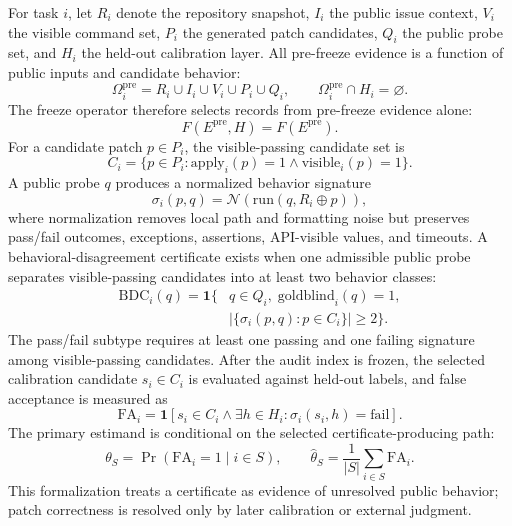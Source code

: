 \documentclass[conference]{IEEEtran}
\begin{document}
For task $i$, let $R_i$ denote the repository snapshot, $I_i$ the public issue context, $V_i$ the visible command set, $P_i$ the generated patch candidates, $Q_i$ the public probe set, and $H_i$ the held-out calibration layer.
All pre-freeze evidence is a function of public inputs and candidate behavior:
\begin{equation}
\Omega_i^{\mathrm{pre}} = R_i \cup I_i \cup V_i \cup P_i \cup Q_i,
\qquad
\Omega_i^{\mathrm{pre}} \cap H_i = \varnothing .
\end{equation}
The freeze operator therefore selects records from pre-freeze evidence alone:
\begin{equation}
F(E^{\mathrm{pre}}, H) = F(E^{\mathrm{pre}}).
\end{equation}
For a candidate patch $p \in P_i$, the visible-passing candidate set is
\begin{equation}
C_i = \{p \in P_i : \mathrm{apply}_i(p)=1 \land \mathrm{visible}_i(p)=1\}.
\end{equation}
A public probe $q$ produces a normalized behavior signature
\begin{equation}
\sigma_i(p,q)=\mathcal{N}(\mathrm{run}(q, R_i \oplus p)),
\end{equation}
where normalization removes local path and formatting noise but preserves pass/fail outcomes, exceptions, assertions, API-visible values, and timeouts.
A behavioral-disagreement certificate exists when one admissible public probe separates visible-passing candidates into at least two behavior classes:
\begin{equation}
\begin{aligned}
\mathrm{BDC}_i(q)=\mathbf{1}\{&
q \in Q_i,\; \mathrm{goldblind}_i(q)=1,\\
&\left|\{\sigma_i(p,q):p\in C_i\}\right|\ge 2\}.
\end{aligned}
\end{equation}
The pass/fail subtype requires at least one passing and one failing signature among visible-passing candidates.
After the audit index is frozen, the selected calibration candidate $s_i \in C_i$ is evaluated against held-out labels, and false acceptance is measured as
\begin{equation}
\mathrm{FA}_i=
\mathbf{1}\!\left[s_i\in C_i \land
\exists h\in H_i:\sigma_i(s_i,h)=\mathrm{fail}\right].
\end{equation}
The primary estimand is conditional on the selected certificate-producing path:
\begin{equation}
\theta_S=\Pr(\mathrm{FA}_i=1\mid i\in S),\qquad
\widehat{\theta}_S=\frac{1}{|S|}\sum_{i\in S}\mathrm{FA}_i .
\end{equation}
This formalization treats a certificate as evidence of unresolved public behavior; patch correctness is resolved only by later calibration or external judgment.
\end{document}
